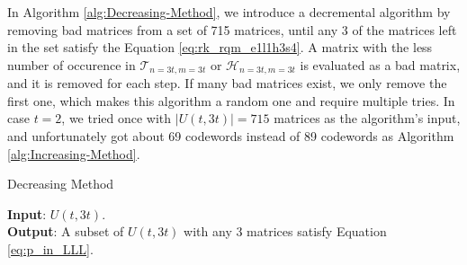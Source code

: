 In Algorithm \ref{alg:Decreasing-Method}, we introduce a decremental
algorithm by removing bad matrices from a set of 715 matrices, until
any 3 of the matrices left in the set satisfy the Equation \ref{eq:rk_rqm_e1l1h3s4}.
A matrix with the less number of occurence in $\mathcal{T}_{n=3t,m=3t}$
or $\mathcal{H}_{n=3t,m=3t}$ is evaluated as a bad matrix, and it
is removed for each step. If many bad matrices exist, we only remove
the first one, which makes this algorithm a random one and require
multiple tries. In case $t=2$, we tried once with $\left|U\left(t,3t\right)\right|=715$
matrices as the algorithm's input, and unfortunately got about 69
codewords instead of 89 codewords as Algorithm \ref{alg:Increasing-Method}. 

\begin{algorithm}[H]
\caption{Decreasing Method \label{alg:Decreasing-Method}}

\hspace*{\algorithmicindent} \textbf{Input}: $U(t,3t)$. \\
\hspace*{\algorithmicindent} \textbf{Output}: A subset of $U(t,3t)$ with any 3 matrices satisfy Equation \ref{eq:p_in_LLL}. 
\begin{algorithmic}[1]
	\REPEAT
		\ENDIF
	\ENDFOR
\end{algorithmic}
\end{algorithm}
